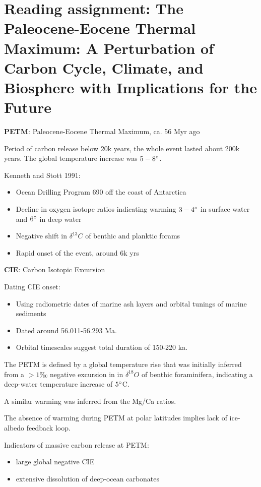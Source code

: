 \section{Reading assignment: The Paleocene-Eocene Thermal Maximum: A
Perturbation of Carbon Cycle, Climate, and Biosphere with Implications for the
Future}

\textbf{PETM}: Paleocene-Eocene Thermal Maximum, ca. 56 Myr ago

Period of carbon release below 20k years, the whole event lasted about 200k
years. The global temperature increase was $5-8 \degree$.

Kenneth and Stott 1991:
\begin{itemize}
	\item Ocean Drilling Program 690 off the coast of Antarctica
	\item Decline in oxygen isotope ratios indicating warming
	$3-4 \degree$ in surface water and $6 \degree$ in deep water
	\item Negative shift in $\delta^{13}C$ of benthic and planktic forams
	\item Rapid onset of the event, around 6k yrs
\end{itemize}

\textbf{CIE}: Carbon Isotopic Excursion

Dating CIE onset:

\begin{itemize}
	\item Using radiometric dates of marine ash layers and orbital tunings
	of marine sediments
	\item Dated around 56.011-56.293 Ma.
	\item Orbital timescales suggest total duration of 150-220 ka.
\end{itemize}

The PETM is defined by a global temperature rise that was initially inferred
from a $> 1$‰ negative excursion in in $\delta^{18}O$ of benthic foraminifera,
indicating a deep-water temperature increase of $5\degree$C.

A similar warming was inferred from the Mg/Ca ratios.

The absence of warming during PETM at polar latitudes implies lack of
ice-albedo feedback loop.

Indicators of massive carbon release at PETM:

\begin{itemize}
	\item large global negative CIE
	\item extensive dissolution of deep-ocean carbonates
\end{itemize}

